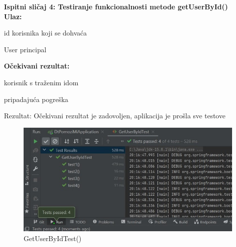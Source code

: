 			\medskip
			
			\noindent \textbf{Ispitni sličaj 4: Testiranje funkcionalnosti metode getUserById()}\\
			
			\medskip
            \noindent\textbf{Ulaz:}
            \begin{packed_enum}
            \item id korisnika koji se dohvaća
            \item User principal
            \end{packed_enum}
            
            \noindent\textbf{Očekivani rezultat:}
            \begin{packed_enum}
            \item korisnik s traženim idom
            \item pripadajuća pogreška
            \end{packed_enum}
            
            \noindent \text
            Rezultat: Očekivani rezultat je zadovoljen, aplikacija je prošla sve testove \\
            
            \begin{figure}[H]
                 \includegraphics[width=\textwidth, height=\textheight, keepaspectratio]{slike/GetUserByIdTest.jpeg}
                \centering
                \caption{GetUserByIdTest()}
            \end{figure}
            
